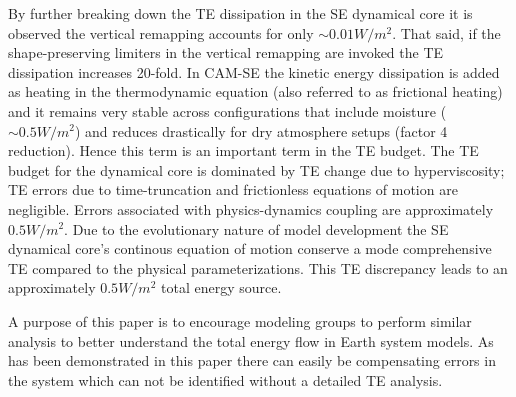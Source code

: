 \documentclass{agujournal}
\begin{document}
By further breaking down the TE dissipation in the SE dynamical core it is observed the vertical remapping accounts for only $\sim 0.01W/m^2$. That said, if the shape-preserving limiters in the vertical remapping are invoked the TE dissipation increases 20-fold. In CAM-SE the kinetic energy dissipation is added as heating in the thermodynamic equation (also referred to as frictional heating) and it remains very stable across configurations that include moisture ($\sim 0.5W/m^2$) and reduces drastically for dry atmosphere setups (factor 4 reduction). Hence this term is an important term in the TE budget. The TE budget for the dynamical core is dominated by TE change due to hyperviscosity; TE errors due to time-truncation and frictionless equations of motion are negligible. Errors associated with physics-dynamics coupling are approximately $0.5W/m^2$. Due to the evolutionary nature of model development the SE dynamical core's continous equation of motion conserve a mode comprehensive TE compared to the physical parameterizations. This TE discrepancy leads to an approximately $0.5W/m^2$ total energy source.

A purpose of this paper is to encourage modeling groups to perform similar analysis to better understand the total energy flow in Earth system models. As has been demonstrated in this paper there can easily be compensating errors in the system which can not be identified without a detailed TE analysis.


\end{document}
